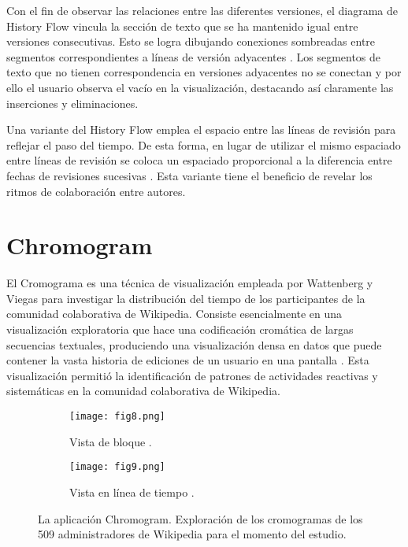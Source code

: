 Con el fin de observar las relaciones entre las diferentes versiones, el diagrama de History Flow vincula la sección de texto que se ha mantenido igual entre versiones consecutivas. Esto se logra dibujando conexiones sombreadas entre segmentos correspondientes a líneas de versión adyacentes . Los segmentos de texto que no tienen correspondencia en versiones adyacentes no se conectan y por ello el usuario observa el vacío en la visualización, destacando así claramente las inserciones y eliminaciones.

Una variante del History Flow emplea el espacio entre las líneas de revisión para reflejar el paso del tiempo. De esta forma, en lugar de utilizar el mismo espaciado entre líneas de revisión se coloca un espaciado proporcional a la diferencia entre fechas de revisiones sucesivas . Esta variante tiene el beneficio de revelar los ritmos de colaboración entre autores.

\section{Chromogram}
El Cromograma es una técnica de visualización empleada por Wattenberg y Viegas \cite{Wat07} para investigar la distribución del tiempo de los participantes de la comunidad colaborativa de Wikipedia. Consiste esencialmente en una visualización exploratoria que hace una codificación cromática de largas secuencias textuales, produciendo una visualización densa en datos que puede contener la vasta historia de ediciones de un usuario en una pantalla . Esta visualización permitió la identificación de patrones de actividades reactivas y sistemáticas en la comunidad colaborativa de Wikipedia.

\begin{figure}[htp]
  \begin{subfigure}[b]{0.45\textwidth}
    \centering
    \texttt{[image: fig8.png]}
    \caption[]{Vista de bloque \cite[Fig. 3]{Wat07}.}
    \label{fig:fig8}
  \end{subfigure}
  \hfill
  \begin{subfigure}[b]{0.45\textwidth}
    \centering
    \texttt{[image: fig9.png]}
    \caption[]{Vista en línea de tiempo \cite[Fig. 4]{Wat07}.}
    \label{fig:fig9}
  \end{subfigure}
  \caption[La aplicacieon Chromogram]{La aplicación Chromogram. Exploración de los cromogramas de los 509 administradores de Wikipedia para el momento del estudio.}
  \label{fig:fig8-9}
\end{figure}

